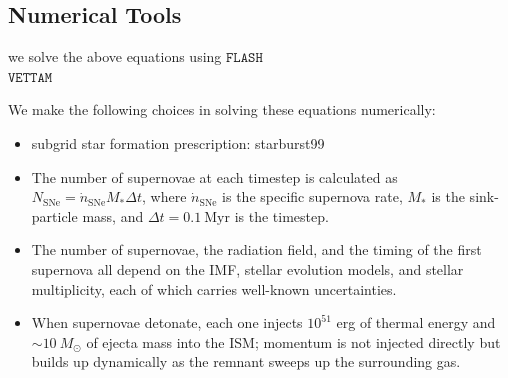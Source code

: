 \documentclass[twocolumn,linenumbers]{aastex631}
\begin{document}
\subsection{Numerical Tools}
we solve the above equations using $\mathtt{FLASH}$ \citep{2000ApJS..131..273F,2008PhST..132a4046D}\\
$\mathtt{VETTAM}$\cite{2022MNRAS.512..401M}

We make the following choices in solving these equations numerically:
\begin{itemize}
    \item subgrid star formation prescription: starburst99
    \item  The number of supernovae at each timestep is calculated as 
$ N_\mathrm{SNe} = \dot{n}_\mathrm{SNe} M_* \Delta t$, where $\dot{n}_\mathrm{SNe}$ is the specific supernova rate, $M_*$ is the sink-particle mass, and $\Delta t = 0.1\ \mathrm{Myr}$ is the timestep. 
    \item The number of supernovae, the radiation field, and the timing of the first supernova all depend on the IMF, stellar evolution models, and stellar multiplicity, each of which carries well-known uncertainties.
    \item When supernovae detonate, each one injects $10^{51}$ erg of thermal energy and $\sim 10\ M_\odot$ of ejecta mass into the ISM; momentum is not injected directly but builds up dynamically as the remnant sweeps up the surrounding gas.
    \end{itemize}
\end{document}
